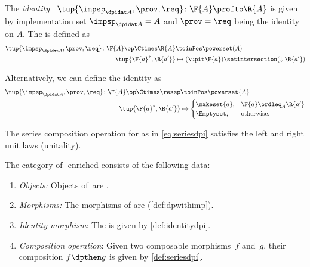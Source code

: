 \begin{definition}
    \label{def:identitydpi}
    The \emph{identity }~$\tup{\impsp_{\dpidat A},\prov,\req} \colon \F{A} \profto \R{A}$ is given by implementation set $\impsp_{\dpidat A} = A$ and $\prov=\req$ being the identity on $A$.
    The  is defined as
    \begin{align}
        \tup{\impsp_{\dpidat A},\prov,\req} \colon \F{A}\op \Ctimes \R{A} & \toinPos \powerset(A) \\
        \tup{\F{a}^*,\R{a'}}                                              & \mapsto (\upit \F{a}) \setintersection (\downarrow \R{a'})
    \end{align}
\end{definition}
\begin{remark}
    Alternatively, we can define the identity  as
    \begin{align}
        \tup{\impsp_{\dpidat A},\prov,\req}\colon \F{A}\op \Ctimes \ressp & \toinPos \powerset{A} \\
        \tup{\F{a}^*,\R{a'}}                                              & \mapsto
        \begin{cases}
            \makeset{a}, & \F{a}\ordleq_A \R{a'} \\
            \Emptyset,   & \text{otherwise}.
        \end{cases}
    \end{align}
\end{remark}

\begin{lemma}
    \label{lem:dp-unital}
    The series composition operation for  as in \cref{eq:seriesdpi} satisfies the left and right unit laws (unitality).
\end{lemma}


\begin{definition}
    \label{def:set-enriched-dp}
    The category of \Set-enriched  \DPI consists of the following data:
    \begin{enumerate}
        \item \emph{Objects:}
              Objects of~\DPI are .
        \item \emph{Morphisms:}
              The morphisms of \DPI are  (\cref{def:dpwithimp}).
        \item \emph{Identity morphism}: The  is given by \cref{def:identitydpi}.
        \item \emph{Composition operation}: Given two composable morphisms~$f$ and~$g$, their composition $f\dpthen g$ is given by \cref{def:seriesdpi}.
    \end{enumerate}
\end{definition}

